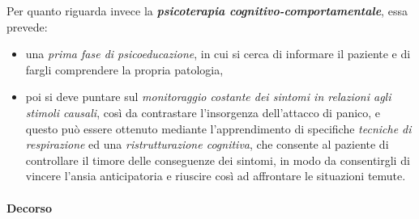 Per quanto riguarda invece la \textbf{\emph{psicoterapia cognitivo-comportamentale}}, essa prevede:

\begin{itemize}
\item
  una \emph{prima fase di psicoeducazione}, in cui si cerca di informare
  il paziente e di fargli comprendere la propria patologia,
\item
  poi si deve puntare sul \emph{monitoraggio costante dei sintomi in
  relazioni agli stimoli causali}, così da contrastare l'insorgenza
  dell'attacco di panico, e questo può essere ottenuto mediante
  l'apprendimento di specifiche \emph{tecniche di respirazione} ed una
  \emph{ristrutturazione cognitiva}, che consente al paziente di
  controllare il timore delle conseguenze dei sintomi, in modo da
  consentirgli di vincere l'ansia anticipatoria e riuscire così ad
  affrontare le situazioni temute.
\end{itemize}

\paragraph{Decorso}

